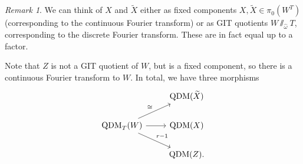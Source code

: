 \documentclass[leqno, openany]{memoir}
\theoremstyle{definition}
\theoremstyle{remark}
\newtheorem{rmk}[thm]{Remark}
\theoremstyle{plain}
\theoremstyle{definition}
\theoremstyle{remark}
\newcommand{\wt}[1]{\widetilde{#1}}
\newcommand{\wh}[1]{\widehat{#1}}
\DeclareMathOperator{\QDM}{QDM}
\begin{document}
\begin{rmk}
    We can think of $X$ and $\wt{X}$ either as fixed components $X, \wt{X} \in \pi_0(W^T)$ (corresponding to the continuous Fourier transform) or as GIT quotients $W \sslash_{\wh{\omega}} T$, corresponding to the discrete Fourier transform. These are in fact equal up to a factor.

    Note that $Z$ is not a GIT quotient of $W$, but is a fixed component, so there is a continuous Fourier transform to $W$. In total, we have three morphisms
    \begin{equation*}
    \begin{tikzcd}
        & \QDM(\wt{X}) \\
        \QDM_T(W) \ar{ur}{\cong} \ar{r} \ar{dr}{r-1} & \QDM(X) \\
        & \QDM(Z).
    \end{tikzcd}
    \end{equation*}
\end{rmk}
\end{document}

